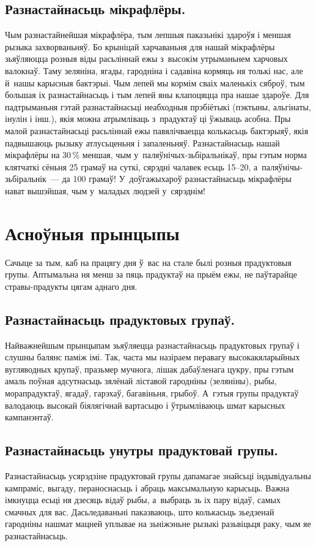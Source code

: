 \subsection{Разнастайнасьць мікрафлёры.}
Чым разнастайнейшая мікрафлёра, тым лепшыя паказьнікі здароўя і меншая рызыка захворваньняў. Бо крыніцай харчаваньня для нашай мікрафлёры зьяўляюцца розныя віды расьліннай ежы з~высокім утрыманьнем харчовых валокнаў. Таму зеляніна, ягады, гародніна і садавіна кормяць ня толькі нас, але й~нашы карысныя бактэрыі. Чым лепей мы кормім сваіх маленькіх сяброў, тым большая іх разнастайнасьць і тым лепей яны клапоцяцца пра нашае здароўе. Для падтрыманьня гэтай разнастайнасьці неабходныя прэбіётыкі (пэктыны, альгінаты, інулін і інш.), якія можна атрымліваць з~прадуктаў ці ўжываць асобна. Пры малой разнастайнасьці расьліннай ежы павялічваецца колькасьць бактэрыяў, якія падвышаюць рызыку атлусьценьня і запаленьняў. Разнастайнасьць нашай мікрафлёры на 30\,\% меншая, чым у~паляўнічых-зьбіральнікаў, пры гэтым норма клятчаткі сёньня 25 грамаў на суткі, сярэдні чалавек есьць 15--20, а~паляўнічы-зьбіральнік~--- да 100 грамаў! У~доўгажыхароў разнастайнасьць мікрафлёры нават вышэйшая, чым у~маладых людзей у~сярэднім!

\section{Асноўныя прынцыпы}

Сачыце за тым, каб на працягу дня ў~вас на стале былі розныя прадуктовыя групы. Аптымальна ня менш за пяць прадуктаў на прыём ежы, не паўтарайце стравы-прадукты цягам аднаго дня.

\subsection{Разнастайнасьць прадуктовых групаў.}
Найважнейшым прынцыпам зьяўляецца разнастайнасьць прадуктовых групаў і слушны балянс паміж імі. Так, часта мы назіраем перавагу высокакяларыйных вугляводных крупаў, празьмер мучнога, лішак дабаўленага цукру, пры гэтым амаль поўная адсутнасьць зялёнай ліставой гародніны (зеляніны), рыбы, морапрадуктаў, ягадаў, гарэхаў, багавіньня, грыбоў. А~гэтыя групы прадуктаў валодаюць высокай біялягічнай вартасьцю і ўтрымліваюць шмат карысных кампанэнтаў.

\subsection{Разнастайнасьць унутры прадуктовай групы.}
Разнастайнасьць усярэдзіне прадуктовай групы дапамагае знайсьці індывідуальны кампраміс, выгаду, пераноснасьць і абраць максымальную карысьць. Важна імкнуцца есьці ня дзесяць відаў рыбы, а~выбраць зь іх пару відаў, самых смачных для вас. Дасьледаваньні паказваюць, што колькасьць зьедзенай гародніны нашмат мацней уплывае на зьніжэньне рызыкі разьвіцьця раку, чым яе разнастайнасьць.


